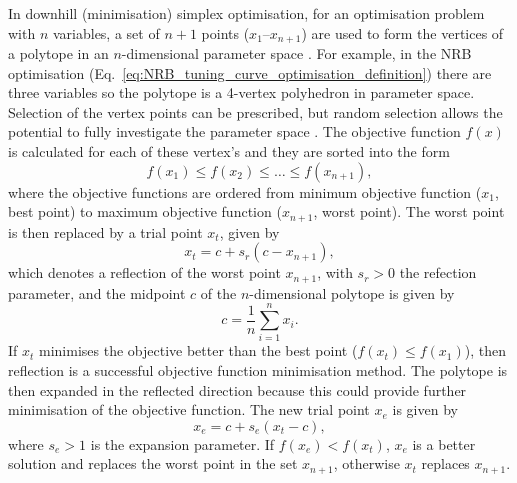 \documentclass[../main.tex]{subfiles}
\begin{document}
In downhill (minimisation) simplex optimisation, for an optimisation problem with $n$ variables, a set of $n+1$ points ($x_{1}$--$x_{n+1}$) are used to form the vertices of a polytope in an $n$-dimensional parameter space \cite{wolfram2021nmaximize} . For example, in the NRB optimisation (Eq.~\ref{eq:NRB_tuning_curve_optimisation_definition}) there are three variables so the polytope is a 4-vertex polyhedron in parameter space. Selection of the vertex points can be prescribed, but random selection allows the potential to fully investigate the parameter space \cite{koshel2002enhancement}. The objective function $f\left(x\right)$ is calculated for each of these vertex's and they are sorted into the form
\begin{equation}
f\left(x_{1}\right) \leq f\left(x_{2}\right) \leq \ldots \leq f\left(x_{n+1}\right),
\label{eq:simplex_polytope_objective_functions}
\end{equation}
where the objective functions are ordered from minimum objective function ($x_{1}$, best point) to maximum objective function ($x_{n+1}$, worst point). The worst point is then replaced by a trial point $x_{t}$, given by
\begin{equation}
x_{t} = c+s_{r}\left(c-x_{n+1}\right),
\label{eq:simplex_trial_point}    
\end{equation}
which denotes a reflection of the worst point $x_{n+1}$, with $s_{r} > 0$ the refection parameter, and the midpoint $c$ of the $n$-dimensional polytope is given by
\begin{equation}
c = \frac{1}{n}\sum_{i=1}^{n}x_{i}.
\label{eq:polytope_centroid_simplex}
\end{equation}
If $x_{t}$ minimises the objective better than the best point ($f\left(x_{t}\right) \leq f\left(x_{1}\right)$), then reflection is a successful objective function minimisation method. The polytope is then expanded in the reflected direction because this could provide further minimisation of the objective function. The new trial point $x_{e}$ is given by
\begin{equation}
x_{e} = c+s_{e}\left(x_{t}-c\right),
\label{eq:simplex_expansion}    
\end{equation}
where $s_{e} > 1$ is the expansion parameter. If $f\left(x_{e}\right) < f\left(x_{t}\right)$, $x_{e}$ is a better solution and replaces the worst point in the set $x_{n+1}$, otherwise $x_{t}$ replaces $x_{n+1}$. 
\end{document}
